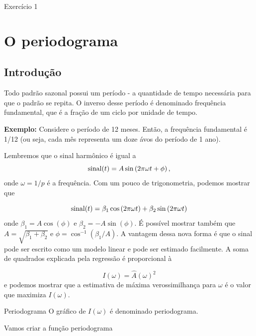 \documentclass[
  letterpaper,
  DIV=11,
  numbers=noendperiod]{scrreprt}
\begin{document}
Exercício 1

\hypertarget{o-periodograma}{%
\section{O periodograma}\label{o-periodograma}}

\hypertarget{introduuxe7uxe3o-1}{%
\subsection{Introdução}\label{introduuxe7uxe3o-1}}

Todo padrão sazonal possui um período - a quantidade de tempo necessária
para que o padrão se repita. O inverso desse período é denominado
frequência fundamental, que é a fração de um ciclo por unidade de tempo.

\textbf{Exemplo:} Considere o período de 12 meses. Então, a frequência
fundamental é 1/12 (ou seja, cada mês representa um doze ávos do período
de 1 ano).

Lembremos que o sinal harmônico é igual a
\[\hbox{sinal}(t)=A\sin\left(2\pi\omega t+\phi\right),\] onde
\(\omega=1/p\) é a frequência. Com um pouco de trigonometria, podemos
mostrar que

\[\hbox{sinal}(t)=\beta_1\cos\left(2\pi\omega t\right)+ \beta_2\sin\left(2\pi\omega t\right)\]
onde \(\beta_1=A\cos(\phi)\) e \(\beta_2=-A\sin(\phi)\). É possível
mostrar também que \(A=\sqrt{\beta_1+\beta_2}\) e
\(\phi=\cos^{-1}(\beta_1/A)\). A vantagem dessa nova forma é que o sinal
pode ser escrito como um modelo linear e pode ser estimado facilmente. A
soma de quadrados explicada pela regressão é proporcional à

\[I(\omega)=\hat{A}(\omega)^2 \] e podemos mostrar que a estimativa de
máxima verossimilhança para \(\omega\) é o valor que maximiza
\(I(\omega)\).

Periodograma O gráfico de \(I(\omega)\) é denominado periodograma.

Vamos criar a função periodograma
\end{document}
